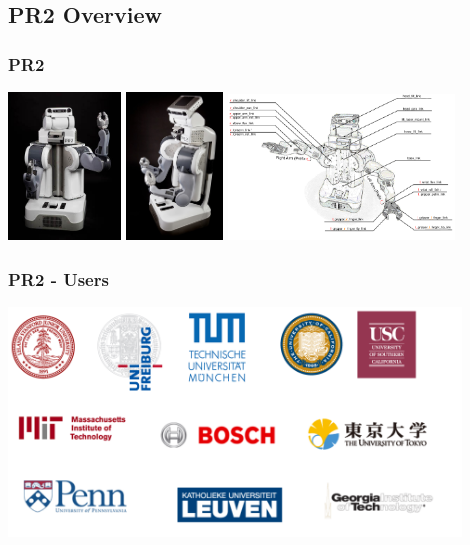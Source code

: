 \subsection{PR2 Overview}
\begin{frame}
  \frametitle{PR2}
\hspace{-3ex}\includegraphics[width=3cm]{images/PR2_front.jpeg} 
\includegraphics[width=2.57cm]{images/PR2_side.jpeg} 
\includegraphics[width=6cm]{images/pr2_link_name.png}
\end{frame}

\begin{frame}
  \frametitle{PR2 - Users}
\centering\includegraphics[width=12cm]{images/pr2_users.pdf} 
\end{frame}

